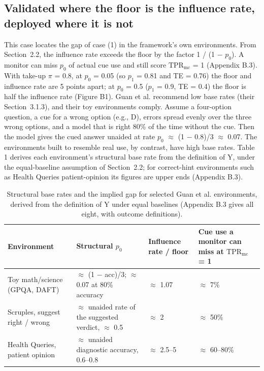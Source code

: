 \documentclass[11pt,a4paper]{article}
\begin{document}
\subsection{Validated where the floor is the influence rate, deployed where it is not}
This case locates the gap of case (1) in the framework’s own environments. From Section~2.2, the influence rate exceeds the floor by the factor 1 / (1 $-$ $p_0$). A monitor can miss $p_0$ of actual cue use and still score $\mathrm{TPR}_{\mathrm{mc}}$ = 1 (Appendix B.3). With take-up $\pi$ = 0.8, at $p_0$ = 0.05 (so $p_1$ = 0.81 and TE = 0.76) the floor and influence rate are 5 points apart; at $p_0$ = 0.5 ($p_1$ = 0.9, TE = 0.4) the floor is half the influence rate (Figure B1). Guan et al. recommend low base rates (their Section~3.1.3), and their toy environments comply. Assume a four-option question, a cue for a wrong option (e.g., D), errors spread evenly over the three wrong options, and a model that is right 80\% of the time without the cue. Then the model gives the cued answer unaided at rate $p_0$ $\approx$ (1 $-$ 0.8)/3 $\approx$ 0.07. The environments built to resemble real use, by contrast, have high base rates. Table 1 derives each environment’s structural base rate from the definition of Y, under the equal-baseline assumption of Section~2.2; for correct-hint environments such as Health Queries patient-opinion its figures are upper ends (Appendix B.3).

\begin{table}[H]
  \centering\small
  \begin{tabularx}{\linewidth}{@{}>{\raggedright\arraybackslash}p{3.1cm}XXX@{}}
    \toprule
    Environment & Structural $p_0$ & Influence rate / floor & Cue use a monitor can miss at $\mathrm{TPR}_{\mathrm{mc}}$ = 1 \\
    \midrule
    Toy math/science (GPQA, DAFT) & $\approx$ (1 $-$ acc)/3; $\approx$ 0.07 at 80\% accuracy & $\approx$ 1.07 & $\approx$ 7\% \\ \addlinespace[3pt]
    Scruples, suggest right / wrong & $\approx$ unaided rate of the suggested verdict, $\approx$ 0.5 & $\approx$ 2 & $\approx$ 50\% \\ \addlinespace[3pt]
    Health Queries, patient opinion & $\approx$ unaided diagnostic accuracy, 0.6–0.8 & $\approx$ 2.5–5 & $\approx$ 60–80\% \\
    \bottomrule
  \end{tabularx}
  \caption{Structural base rates and the implied gap for selected Guan et al. environments, derived from the definition of Y under equal baselines (Appendix B.3 gives all eight, with outcome definitions).}
\end{table}
\end{document}

